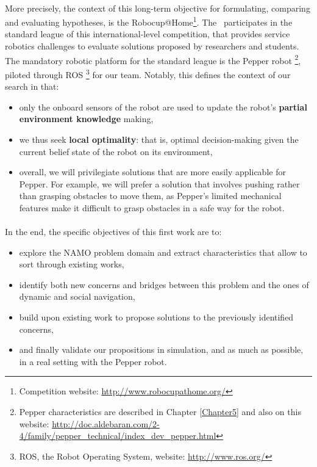 \paragraph{} More precisely, the context of this long-term objective for formulating, comparing and evaluating hypotheses, is the Robocup@Home\footnote{Competition website: \url{http://www.robocupathome.org/}}. The \groupname \, participates in the standard league of this international-level competition, that provides service robotics challenges to evaluate solutions proposed by researchers and students. The mandatory robotic platform for the standard league is the Pepper robot \footnote{Pepper characteristics are described in Chapter \ref{Chapter5} and also on this website: \url{http://doc.aldebaran.com/2-4/family/pepper_technical/index_dev_pepper.html}}, piloted through ROS \footnote{ROS, the Robot Operating System, website: \url{http://www.ros.org/}} for our team. Notably, this defines the context of our search in that:
\begin{itemize}
  \item only the onboard sensors of the robot are used to update the robot's \textbf{partial environment knowledge} making,
  \item we thus seek \textbf{local optimality}: that is, optimal decision-making given the current belief state of the robot on its environment,
  \item overall, we will privilegiate solutions that are more easily applicable for Pepper. For example, we will prefer a solution that involves pushing rather than grasping obstacles to move them, as Pepper's limited mechanical features make it difficult to grasp obstacles in a safe way for the robot.
\end{itemize}

\paragraph{} In the end, the specific objectives of this first work are to:
\begin{itemize}
  \item explore the NAMO problem domain and extract characteristics that allow to sort through existing works,
  \item identify both new concerns and bridges between this problem and the ones of dynamic and social navigation,
  \item build upon existing work to propose solutions to the previously identified concerns,
  \item and finally validate our propositions in simulation, and as much as possible, in a real setting with the Pepper robot.
\end{itemize}

